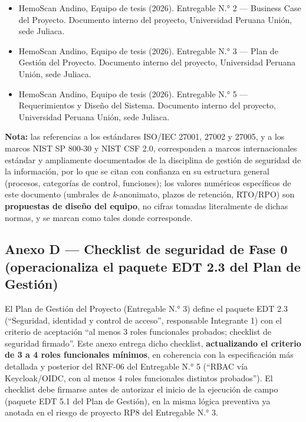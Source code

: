 \documentclass[11pt,a4paper]{article}
\begin{document}
\begin{itemize}
\item
  HemoScan Andino, Equipo de tesis (2026). Entregable N.° 2 --- Business Case del Proyecto. Documento interno del proyecto, Universidad Peruana Unión, sede Juliaca.
\item
  HemoScan Andino, Equipo de tesis (2026). Entregable N.° 3 --- Plan de Gestión del Proyecto. Documento interno del proyecto, Universidad Peruana Unión, sede Juliaca.
\item
  HemoScan Andino, Equipo de tesis (2026). Entregable N.° 5 --- Requerimientos y Diseño del Sistema. Documento interno del proyecto, Universidad Peruana Unión, sede Juliaca.
\end{itemize}

\textbf{Nota:} las referencias a los estándares ISO/IEC 27001, 27002 y 27005, y a los marcos NIST SP 800-30 y NIST CSF 2.0, corresponden a marcos internacionales estándar y ampliamente documentados de la disciplina de gestión de seguridad de la información, por lo que se citan con confianza en su estructura general (procesos, categorías de control, funciones); los valores numéricos específicos de este documento (umbrales de \emph{k}-anonimato, plazos de retención, RTO/RPO) son \textbf{propuestas de diseño del equipo}, no cifras tomadas literalmente de dichas normas, y se marcan como tales donde corresponde.

\subsection{Anexo D --- Checklist de seguridad de Fase 0 (operacionaliza el paquete EDT 2.3 del Plan de Gestión)}\label{anexo-d-checklist-de-seguridad-de-fase-0-operacionaliza-el-paquete-edt-2.3-del-plan-de-gestiuxf3n}

El Plan de Gestión del Proyecto (Entregable N.° 3) define el paquete EDT 2.3 (``Seguridad, identidad y control de acceso'', responsable Integrante 1) con el criterio de aceptación ``al menos 3 roles funcionales probados; checklist de seguridad firmado''. Este anexo entrega dicho checklist, \textbf{actualizando el criterio de 3 a 4 roles funcionales mínimos}, en coherencia con la especificación más detallada y posterior del RNF-06 del Entregable N.° 5 (``RBAC vía Keycloak/OIDC, con al menos 4 roles funcionales distintos probados''). El checklist debe firmarse antes de autorizar el inicio de la ejecución de campo (paquete EDT 5.1 del Plan de Gestión), en la misma lógica preventiva ya anotada en el riesgo de proyecto RP8 del Entregable N.° 3.
\end{document}
